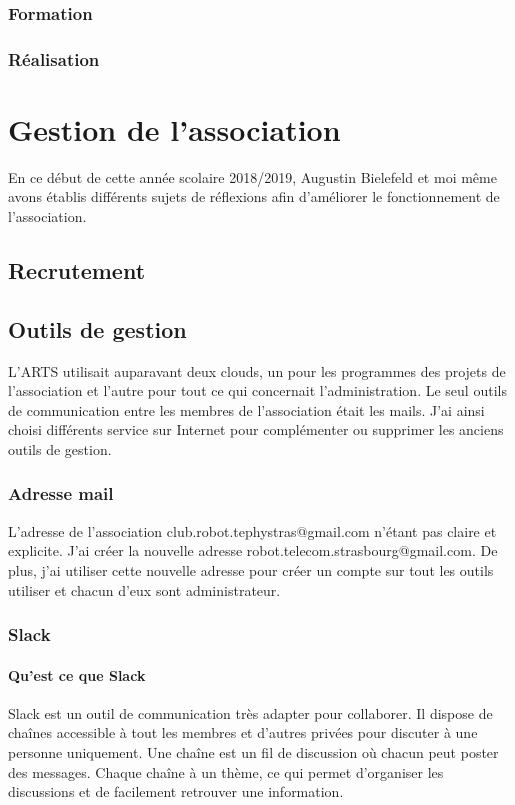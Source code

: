 \documentclass[12pt,a4paper]{report}
\begin{document}
    \subsection{Formation}
    \subsection{Réalisation}

\chapter{Gestion de l'association}
  En ce début de cette année scolaire 2018/2019, Augustin Bielefeld et moi même avons établis différents sujets de réflexions afin d'améliorer le fonctionnement de l'association.

  \section{Recrutement}


  \section{Outils de gestion}
    L'ARTS utilisait auparavant deux clouds, un pour les programmes des projets de l'association et l'autre pour tout ce qui concernait l'administration.
    Le seul outils de communication entre les membres de l'association était les mails.
    J'ai ainsi choisi différents service sur Internet pour complémenter ou supprimer les anciens outils de gestion.

    \subsection{Adresse mail}
      L'adresse de l'association club.robot.tephystras@gmail.com n'étant pas claire et explicite. J'ai créer la nouvelle adresse robot.telecom.strasbourg@gmail.com.
      De plus, j'ai utiliser cette nouvelle adresse pour créer un compte sur tout les outils utiliser et chacun d'eux sont administrateur.

    \subsection{Slack}
      \subsubsection{Qu'est ce que Slack}
        Slack est un outil de communication très adapter pour collaborer. Il dispose de chaînes accessible à tout les membres et d'autres privées pour discuter à une personne uniquement. Une chaîne est un fil de discussion où chacun peut poster des messages. Chaque chaîne à un thème, ce qui permet d'organiser les discussions et de facilement retrouver une information.
\end{document}
